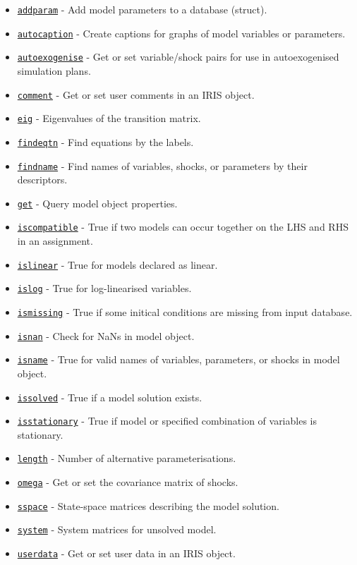 \begin{itemize}
\itemsep1pt\parskip0pt
\item
  \href{model/addparam}{\texttt{addparam}} - Add model parameters to a
  database (struct).
\item
  \href{model/autocaption}{\texttt{autocaption}} - Create captions for
  graphs of model variables or parameters.
\item
  \href{model/autoexogenise}{\texttt{autoexogenise}} - Get or set
  variable/shock pairs for use in autoexogenised simulation plans.
\item
  \href{model/comment}{\texttt{comment}} - Get or set user comments in
  an IRIS object.
\item
  \href{model/eig}{\texttt{eig}} - Eigenvalues of the transition matrix.
\item
  \href{model/findeqtn}{\texttt{findeqtn}} - Find equations by the
  labels.
\item
  \href{model/findname}{\texttt{findname}} - Find names of variables,
  shocks, or parameters by their descriptors.
\item
  \href{model/get}{\texttt{get}} - Query model object properties.
\item
  \href{model/iscompatible}{\texttt{iscompatible}} - True if two models
  can occur together on the LHS and RHS in an assignment.
\item
  \href{model/islinear}{\texttt{islinear}} - True for models declared as
  linear.
\item
  \href{model/islog}{\texttt{islog}} - True for log-linearised
  variables.
\item
  \href{model/ismissing}{\texttt{ismissing}} - True if some initical
  conditions are missing from input database.
\item
  \href{model/isnan}{\texttt{isnan}} - Check for NaNs in model object.
\item
  \href{model/isname}{\texttt{isname}} - True for valid names of
  variables, parameters, or shocks in model object.
\item
  \href{model/issolved}{\texttt{issolved}} - True if a model solution
  exists.
\item
  \href{model/isstationary}{\texttt{isstationary}} - True if model or
  specified combination of variables is stationary.
\item
  \href{model/length}{\texttt{length}} - Number of alternative
  parameterisations.
\item
  \href{model/omega}{\texttt{omega}} - Get or set the covariance matrix
  of shocks.
\item
  \href{model/sspace}{\texttt{sspace}} - State-space matrices describing
  the model solution.
\item
  \href{model/system}{\texttt{system}} - System matrices for unsolved
  model.
\item
  \href{model/userdata}{\texttt{userdata}} - Get or set user data in an
  IRIS object.
\end{itemize}

